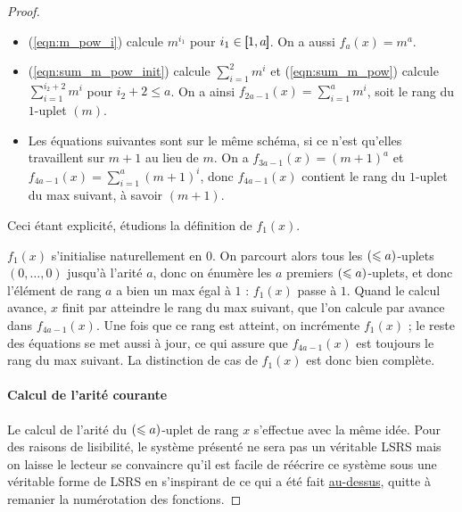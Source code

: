 \begin{proof}
			\begin{itemize}
				\item 	(\ref{eqn:m_pow_i}) calcule $m^{i_1}$ pour $i_1 \in \left[\,\!\!\!\left[ 1 , a \right]\,\!\!\!\right]$. On a aussi $f_{a}(x) = m^a$. 
				
				\item 	(\ref{eqn:sum_m_pow_init}) calcule $\sum_{i = 1}^{2} m^i$ et (\ref{eqn:sum_m_pow}) calcule $\sum_{i = 1}^{i_2+2} m^i$ pour $i_2+2 \leqslant a$. On a ainsi $f_{2a-1}(x) = \sum_{i = 1}^{a} m^i$, soit le rang du $1$-uplet $(m)$.
				
				\item 	Les équations suivantes sont sur le même schéma, si ce n'est qu'elles travaillent sur $m+1$ au lieu de $m$. On a $f_{3a-1}(x) = (m+1)^a$ et $f_{4a-1}(x) = \sum_{i = 1}^{a} (m+1)^i$, donc $f_{4a-1}(x)$ contient le rang du $1$-uplet du max suivant, à savoir $(m+1)$. 
			\end{itemize}
			
			Ceci étant explicité, étudions la définition de $f_1(x)$. 
			
			$f_1(x)$ s'initialise naturellement en $0$. On parcourt alors tous les $\left( \leqslant a \right)$-uplets $(0, \dots, 0)$ jusqu'à l'arité $a$, donc on énumère les $a$ premiers $\left( \leqslant a \right)$-uplets, et donc l'élément de rang $a$ a bien un max égal à $1$ : $f_1(x)$ passe à $1$. Quand le calcul avance, $x$ finit par atteindre le rang du max suivant, que l'on calcule par avance dans $f_{4a-1}(x)$. Une fois que ce rang est atteint, on incrémente $f_1(x)$ ; le reste des équations se met aussi à jour, ce qui assure que $f_{4a-1}(x)$ est toujours le rang du max suivant. La distinction de cas de $f_1(x)$ est donc bien complète.
			
		\paragraph{Calcul de l'arité courante}
			\label{par:calcul_arite_courante}
			Le calcul de l'arité du $\left( \leqslant a \right)$-uplet de rang $x$ s'effectue avec la même idée. Pour des raisons de lisibilité, le système présenté ne sera pas un véritable LSRS mais on laisse le lecteur se convaincre qu'il est facile de réécrire ce système sous une véritable forme de LSRS en s'inspirant de ce qui a été fait \hyperref[par:calcul_max_bon_ordre]{au-dessus}, quitte à remanier la numérotation des fonctions. 
			

\end{proof}
